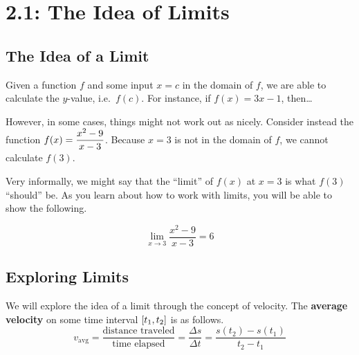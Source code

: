\documentclass[12pt]{article}
\begin{document}
\section*{2.1: The Idea of Limits}


\vspace{5mm}

\subsection*{The Idea of a Limit}
Given a function $f$ and some input $x=c$ in the domain of $f$, we are able to calculate the $y$-value, i.e.\ $f(c)$. For instance, if $f(x)=3x-1$, then\dots

\vspace{15mm}

However, in some cases, things might not work out as nicely. Consider instead the function $f(x)=\displaystyle\frac{x^2-9}{x-3}$. Because $x=3$ is not in the domain of $f$, we cannot calculate $f(3)$.

\vspace{15mm}

Very informally, we might say that the ``limit'' of $f(x)$ at $x=3$ is what $f(3)$ ``should'' be. As you learn about how to work with limits, you will be able to show the following.

$$\lim_{x\to 3}\frac{x^2-9}{x-3}=6$$

\vspace{5mm}

\subsection*{Exploring Limits}
We will explore the idea of a limit through the concept of velocity. The \textbf{average velocity} on some time interval $\left[ t_1,t_2\right]$ is as follows.
$$v_{\text{avg}}=\frac{\text{distance traveled}}{\text{time elapsed}}=\frac{\Delta s}{\Delta t}=\frac{s(t_2)-s(t_1)}{t_2-t_1}$$
\end{document}
